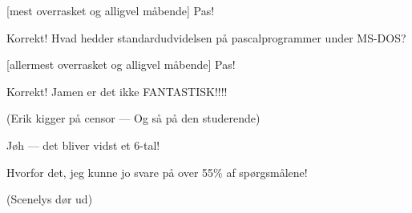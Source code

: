 \documentclass{article}
\begin{document}
\begin{sketch}
 [mest overrasket og alligvel måbende] Pas!

 Korrekt! Hvad hedder standardudvidelsen på pascalprogrammer under 
MS-DOS?

 [allermest overrasket og alligvel måbende] Pas!

 Korrekt! Jamen er det ikke FANTASTISK!!!! 

\scene (Erik kigger på censor --- Og så på den studerende)

 Jøh --- det bliver vidst et 6-tal!

 Hvorfor det, jeg kunne jo svare på over 55\% af
spørgsmålene! 

\scene (Scenelys dør ud)

\end{sketch}
\end{document}

